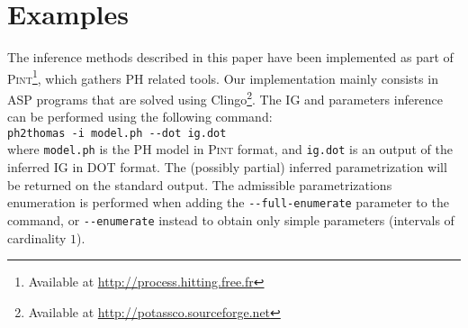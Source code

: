 \section{Examples}\label{sec:examples}



\medskip

The inference methods described in this paper have been implemented as part of
\textsc{Pint}\footnote{Available at \url{http://process.hitting.free.fr}}, which gathers PH related tools.
Our implementation mainly consists in ASP programs that are solved using
Clingo\footnote{Available at \url{http://potassco.sourceforge.net}}.
The IG and parameters inference can be performed using the following command:\\
  \hspace*{1.2em}\texttt{ph2thomas -i model.ph -{}-dot ig.dot}\\
where \texttt{model.ph} is the PH model in \textsc{Pint} format,
and \texttt{ig.dot} is an output of the inferred IG in DOT format.
The (possibly partial) inferred parametrization will be returned on the standard output.
The admissible parametrizations enumeration is performed when adding the \texttt{-{}-full-enumerate} parameter to the command,
or \texttt{-{}-enumerate} instead to obtain only simple parameters (intervals of cardinality $1$).

\begin{comment}
\todo{Check this paragraph}
Applied to the example in \pref{fig:runningPH-2} where cooperations have been defined,
our method infers the IG and parametrization given in \pref{fig:runningBRN}.
Regarding the example in \pref{fig:runningPH-1}, the same IG is inferred, as well as for the
parametrization except for the parameters $K_{a,\{b\},\{c\}}$ and $K_{a,\{c\},\{b\}}$ which are
undefined (because of the lack of cooperativity between $b$ and $c$).
In such a case, this partial parametrization allows 36 admissible complete parametrizations, as two
parameters with 3 potential values could not be inferred.
If we constrain these latter parameters so that they contain exactly one element, we obtain only 9
admissible parametrizations.
\end{comment}



